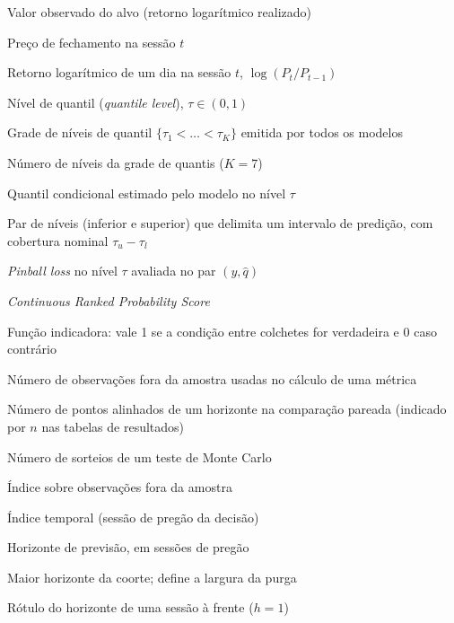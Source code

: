 
\begin{simbolos}
    \item[$y$] Valor observado do alvo (retorno logarítmico realizado)
    \item[$P_t$] Preço de fechamento na sessão $t$
    \item[$r_t$] Retorno logarítmico de um dia na sessão $t$, $\log(P_t/P_{t-1})$
    \item[$\tau$] Nível de quantil (\textit{quantile level}), $\tau \in (0,1)$
    \item[$\mathcal{T}$] Grade de níveis de quantil $\{\tau_1 < \dots < \tau_K\}$ emitida por todos os modelos
    \item[$K$] Número de níveis da grade de quantis ($K = 7$)
    \item[$\hat{q}_\tau$] Quantil condicional estimado pelo modelo no nível $\tau$
    \item[$(\tau_l, \tau_u)$] Par de níveis (inferior e superior) que delimita um intervalo de predição, com cobertura nominal $\tau_u - \tau_l$
    \item[$L_\tau(y, \hat{q})$] \textit{Pinball loss} no nível $\tau$ avaliada no par $(y, \hat{q})$
    \item[$\mathrm{CRPS}$] \textit{Continuous Ranked Probability Score}
    \item[{$\mathbb{1}[\cdot]$}] Função indicadora: vale 1 se a condição entre colchetes for verdadeira e 0 caso contrário
    \item[$N$] Número de observações fora da amostra usadas no cálculo de uma métrica
    \item[$T$] Número de pontos alinhados de um horizonte na comparação pareada (indicado por $n$ nas tabelas de resultados)
    \item[$B$] Número de sorteios de um teste de Monte Carlo
    \item[$i$] Índice sobre observações fora da amostra
    \item[$t$] Índice temporal (sessão de pregão da decisão)
    \item[$h$] Horizonte de previsão, em sessões de pregão
    \item[$h_{\max}$] Maior horizonte da coorte; define a largura da purga
    \item[$h+1$] Rótulo do horizonte de uma sessão à frente (\(h = 1\))

\end{simbolos}
